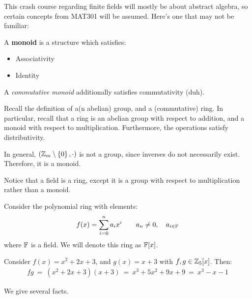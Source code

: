 \documentclass{article}
\begin{document}

This crash course regarding finite fields will mostly be about abstract algebra,
so certain concepts from MAT301 will be assumed. Here's one that may not be familiar:

\begin{defn}
    A \textbf{monoid} is a structure which satisfies:
    \begin{itemize}
        \item Associativity
        \item Identity
    \end{itemize}
    A \textit{commutative monoid} additionally satisfies commutativity (duh).
\end{defn}

Recall the definition of a(n abelian) group,
and a (commutative) ring.
In particular, recall that a ring is an abelian group with respect to addition,
and a monoid with respect to multiplication.
Furthermore, the operations satisfy distributivity.

\begin{xmp}[source=Primary Source Material]
    In general, $ (\mathbb{Z}_{m} \setminus \left\{{0}\right\}, \cdot) $ is not a group,
    since inverses do not necessarily exist.
    Therefore, it is a monoid.
\end{xmp}

Notice that a field is a ring, except it is a group with respect to
multiplication rather than a monoid.

\begin{defn}
    Consider the polynomial ring with elements:
    \begin{equation*}
        f(x) = \sum_{i=0}^{n} a_{i}x^{i} \qquad a_{n} \neq 0 , \quad a_{i \in \mathbb{F}}
    \end{equation*}
    where $ \mathbb{F} $ is a field.
    We will denote this ring as $ \mathbb{F}[x] $.
\end{defn}

\begin{xmp}[source=Primary Source Material]
    Consider $ f(x) = x^{2} + 2x + 3 $,
    and $ g(x) = x + 3 $ with $ f, g \in \mathbb{Z}_{5}[x] $. Then:
    \begin{gather*}
        fg \ = \ (x^{2} + 2x + 3)(x + 3) \ = \ x^{3} + 5x^{2} + 9x + 9 \ = \ x^{3} - x - 1
    \end{gather*}
\end{xmp}

We give several facts.
\end{document}
